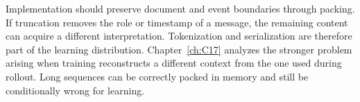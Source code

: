 Implementation should preserve document and event boundaries through packing. If truncation removes the role or timestamp of a message, the remaining content can acquire a different interpretation. Tokenization and serialization are therefore part of the learning distribution. Chapter~\ref{ch:C17} analyzes the stronger problem arising when training reconstructs a different context from the one used during rollout. Long sequences can be correctly packed in memory and still be conditionally wrong for learning.

